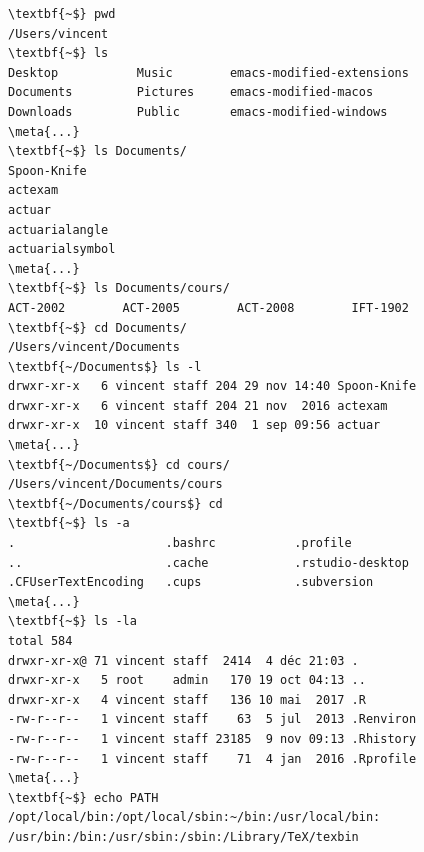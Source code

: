 \begin{exercice}
\begin{sol}
\begin{Schunk}
\begin{Verbatim}[commandchars=\\\{\}]
\textbf{~$} pwd
/Users/vincent
\textbf{~$} ls
Desktop           Music        emacs-modified-extensions
Documents         Pictures     emacs-modified-macos
Downloads         Public       emacs-modified-windows
\meta{...}
\textbf{~$} ls Documents/
Spoon-Knife
actexam
actuar
actuarialangle
actuarialsymbol
\meta{...}
\textbf{~$} ls Documents/cours/
ACT-2002        ACT-2005        ACT-2008        IFT-1902
\textbf{~$} cd Documents/
/Users/vincent/Documents
\textbf{~/Documents$} ls -l
drwxr-xr-x   6 vincent staff 204 29 nov 14:40 Spoon-Knife
drwxr-xr-x   6 vincent staff 204 21 nov  2016 actexam
drwxr-xr-x  10 vincent staff 340  1 sep 09:56 actuar
\meta{...}
\textbf{~/Documents$} cd cours/
/Users/vincent/Documents/cours
\textbf{~/Documents/cours$} cd
\textbf{~$} ls -a
.                     .bashrc           .profile
..                    .cache            .rstudio-desktop
.CFUserTextEncoding   .cups             .subversion
\meta{...}
\textbf{~$} ls -la
total 584
drwxr-xr-x@ 71 vincent staff  2414  4 déc 21:03 .
drwxr-xr-x   5 root    admin   170 19 oct 04:13 ..
drwxr-xr-x   4 vincent staff   136 10 mai  2017 .R
-rw-r--r--   1 vincent staff    63  5 jul  2013 .Renviron
-rw-r--r--   1 vincent staff 23185  9 nov 09:13 .Rhistory
-rw-r--r--   1 vincent staff    71  4 jan  2016 .Rprofile
\meta{...}
\textbf{~$} echo PATH
/opt/local/bin:/opt/local/sbin:~/bin:/usr/local/bin:
/usr/bin:/bin:/usr/sbin:/sbin:/Library/TeX/texbin
\end{Verbatim}
    \end{Schunk}
  \end{sol}
\end{exercice}


